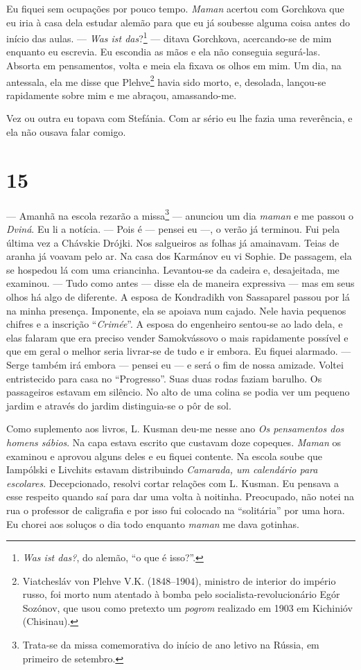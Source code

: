 Eu fiquei sem ocupações por pouco tempo. \emph{Maman} acertou com
Gorchkova que eu iria à casa dela estudar alemão para que eu já soubesse
alguma coisa antes do início das aulas. --- \emph{Was ist
das}?\footnote{\emph{Was ist das?}, do alemão, ``o que é isso?''.} ---
ditava Gorchkova, acercando-se de mim enquanto eu escrevia. Eu escondia
as mãos e ela não conseguia segurá-las. Absorta em pensamentos, volta e
meia ela fixava os olhos em mim. Um dia, na antessala, ela me disse que
Plehve\footnote{Viatchesláv von Plehve V.K. (1848--1904), ministro de
  interior do império russo, foi morto num atentado à bomba pelo
  socialista-revolucionário Egór Sozónov, que usou como pretexto um
  \emph{pogrom} realizado em 1903 em Kichinióv (Chisinau).} havia sido
morto, e, desolada, lançou-se rapidamente sobre mim e me abraçou,
amassando-me.

Vez ou outra eu topava com Stefánia. Com ar sério eu lhe fazia uma
reverência, e ela não ousava falar comigo.

\section{15}

--- Amanhã na escola rezarão a missa\footnote{Trata-se da missa
  comemorativa do início de ano letivo na Rússia, em primeiro de
  setembro.} --- anunciou um dia \emph{maman} e me passou o
\emph{Dviná}. Eu li a notícia. --- Pois é --- pensei eu ---, o verão já
terminou. Fui pela última vez a Chávskie Drójki. Nos salgueiros as
folhas já amainavam. Teias de aranha já voavam pelo ar. Na casa dos
Karmánov eu vi Sophie. De passagem, ela se hospedou lá com uma
criancinha. Levantou-se da cadeira e, desajeitada, me examinou. --- Tudo
como antes --- disse ela de maneira expressiva --- mas em seus olhos há
algo de diferente. A esposa de Kondradikh von Sassaparel passou por lá
na minha presença. Imponente, ela se apoiava num cajado. Nele havia
pequenos chifres e a inscrição ``\emph{Crimée}''. A esposa do engenheiro
sentou-se ao lado dela, e elas falaram que era preciso vender
Samokvássovo o mais rapidamente possível e que em geral o melhor seria
livrar-se de tudo e ir embora. Eu fiquei alarmado. --- Serge também irá
embora --- pensei eu --- e será o fim de nossa amizade. Voltei
entristecido para casa no ``Progresso''. Suas duas rodas faziam barulho.
Os passageiros estavam em silêncio. No alto de uma colina se podia ver
um pequeno jardim e através do jardim distinguia-se o pôr de sol.

Como suplemento aos livros, L. Kusman deu-me nesse ano \emph{Os
pensamentos dos homens sábios}. Na capa estava escrito que custavam doze
copeques. \emph{Maman} os examinou e aprovou alguns deles e eu fiquei
contente. Na escola soube que Iampólski e Livchits estavam distribuindo
\emph{Camarada, um calendário para escolares}. Decepcionado, resolvi
cortar relações com L. Kusman. Eu pensava a esse respeito quando saí
para dar uma volta à noitinha. Preocupado, não notei na rua o professor
de caligrafia e por isso fui colocado na ``solitária'' por uma hora. Eu
chorei aos soluços o dia todo enquanto \emph{maman} me dava gotinhas.


